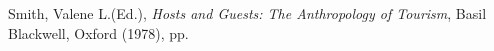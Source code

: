 \begin{thebibliography}{9}
	Smith, Valene L.(Ed.), 
	\emph{Hosts and Guests: The Anthropology of Tourism}, 
	Basil Blackwell, Oxford (1978), pp. 

\end{thebibliography}